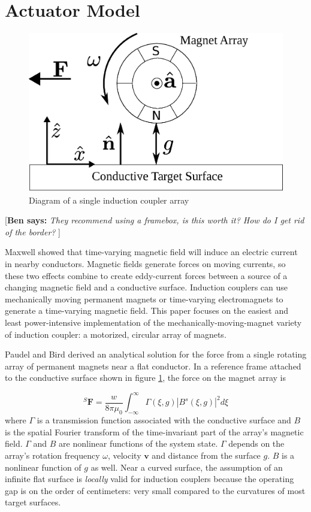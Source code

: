 \documentclass[letterpaper, 10 pt, conference]{ieeeconf}  %
\newcommand{\ben}[1]{{\color{red}\small\par {[{\bf Ben says:} {\em #1}} ] \\    }}
\begin{document}
%
\section{Actuator Model}
\label{sec:model}
 \begin{figure}[thpb]
      \centering
      \includegraphics[width = 0.75\linewidth]{figures/spin_mag_diagram.eps}
      \caption{Diagram of a single induction coupler array}
      \label{fig:single_array}
   \end{figure}
\ben{They recommend using a framebox, is this worth it? How do I get rid of the border?}   
\par Maxwell showed that time-varying magnetic field will induce an electric current in nearby conductors. Magnetic fields generate forces on moving currents, so these two effects combine to create eddy-current forces between a source of a changing magnetic field and a conductive surface. Induction couplers can use mechanically moving permanent magnets or time-varying electromagnets to generate a time-varying magnetic field. This paper focuses on the easiest and least power-intensive implementation of the mechanically-moving-magnet variety of induction coupler: a motorized, circular array of magnets. 
%
\par Paudel and Bird derived an analytical solution for the force from a single rotating array of permanent magnets near a flat conductor. \cite{Paudel2013} In a reference frame attached to the conductive surface shown in figure \ref{fig:single_array}, the force on the magnet array is

\begin{equation}
\label{eq:Paudel55}
{}^S\textbf{F} = \frac{w}{8\pi\mu_0} \int^{\infty}_{-\infty}\Gamma(\xi,g)|B^s(\xi,g)|^2 d\xi
\end{equation}
where $\Gamma$ is a transmission function associated with the conductive surface and $B$ is the spatial Fourier transform of the time-invariant part of the array's magnetic field.
$\Gamma$ and $B$ are nonlinear functions of the system state. $\Gamma$ depends on the array's rotation frequency $\omega$, velocity $\textbf{v}$ and distance from the surface $g$. $B$ is a nonlinear function of $g$ as well. Near a curved surface, the assumption of an infinite flat surface is \textit{locally} valid for induction couplers because the operating gap is on the order of centimeters: very small compared to the curvatures of most target surfaces. 
 
\end{document}
